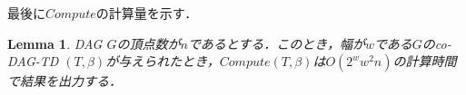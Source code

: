 \documentclass[master]{kuisthesis}		%
\theoremstyle{plain}
\newtheorem{lemma}{Lemma}
\theoremstyle{definition}
\begin{document}

最後に$Compute$の計算量を示す．

\begin{lemma}
    DAG $G$の頂点数が$n$であるとする．このとき，幅が$w$である$G$のco-DAG-TD $(T, \beta)$が与えられたとき，$Compute(T, \beta)$は$O(2^ww^2n)$の計算時間で結果を出力する．
\end{lemma}
\end{document}

